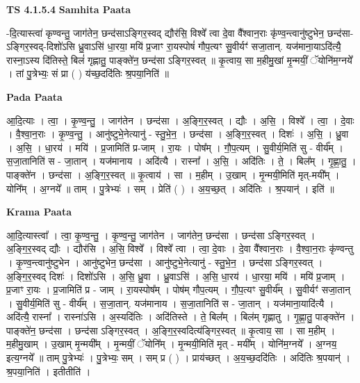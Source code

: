 \documentclass[17pt]{extarticle}
\begin{document}
\textbf{TS 4.1.5.4 } \newline
\textbf{Samhita Paata} \newline

-दि॒त्यास्त्वा॑ कृण्वन्तु॒ जाग॑तेन॒ छन्द॑साऽङ्गिर॒स्वद् द्यौर॑सि॒ विश्वे᳚ त्वा दे॒वा वै᳚श्वान॒राः कृ॑ण्व॒न्त्वानु॑ष्टुभेन॒ छन्द॑सा-ऽङ्गिर॒स्वद्-दिशो॑ऽसि ध्रु॒वाऽसि॑ धा॒रया॒ मयि॑ प्र॒जाꣳ रा॒यस्पोषं॑ गौप॒त्यꣳ सु॒वीर्यꣳ॑ सजा॒तान्. यज॑माना॒याऽदि॑त्यै॒ रास्ना॒ऽस्य दि॑तिस्ते॒ बिलं॑ गृह्णातु॒ पाङ्क्ते॑न॒ छन्द॑सा ऽङ्गिर॒स्वत् ॥ कृ॒त्वाय॒ सा म॒हीमु॒खां मृ॒न्मयीं॒ ॅयोनि॑म॒ग्नये᳚ । तां पु॒त्रेभ्यः॒ सं प्रा ( ) य॑च्छ॒ददि॑तिः श्र॒पया॒निति॑ ॥ \newline

\textbf{Pada Paata} \newline

आ॒दि॒त्याः । त्वा॒ । कृ॒ण्व॒न्तु॒ । जाग॑तेन । छन्द॑सा । अ॒ङ्गि॒र॒स्वत् । द्यौः । अ॒सि॒ । विश्वे᳚ । त्वा॒ । दे॒वाः । वै॒श्वा॒न॒राः । कृ॒ण्व॒न्तु॒ । आनु॑ष्टुभे॒नेत्यानु॑ - स्तु॒भे॒न॒ । छन्द॑सा । अ॒ङ्गि॒र॒स्वत् । दिशः॑ । अ॒सि॒ । ध्रु॒वा । अ॒सि॒ । धा॒रय॑ । मयि॑ । प्र॒जामिति॑ प्र-जाम् । रा॒यः । पोष᳚म् । गौ॒प॒त्यम् । सु॒वीर्य॒मिति॑ सु - वीर्य᳚म् । स॒जा॒तानिति॑ स - जा॒तान् । यज॑मानाय । अदि॑त्यै । रास्ना᳚ । अ॒सि॒ । अदि॑तिः । ते॒ । बिल᳚म् । गृ॒ह्णा॒तु॒ । पाङ्क्ते॑न । छन्द॑सा । अ॒ङ्गि॒र॒स्वत् ॥ कृ॒त्वाय॑ । सा । म॒हीम् । उ॒खाम् । मृ॒न्मयी॒मिति॑ मृत्-मयी᳚म् । योनि᳚म् । अ॒ग्नये᳚ ॥ ताम् । पु॒त्रेभ्यः॑ । सम् । प्रेति॑ ( ) । अ॒य॒च्छ॒त् । अदि॑तिः । श्र॒पयान्॑ । इति॑ ॥  \newline


\textbf{Krama Paata} \newline

आ॒दि॒त्यास्त्वा᳚ । त्वा॒ कृ॒ण्व॒न्तु॒ । कृ॒ण्व॒न्तु॒ जाग॑तेन । जाग॑तेन॒ छन्द॑सा । छन्द॑सा ऽङ्गिर॒स्वत् । अ॒ङ्गि॒र॒स्वद् द्यौः । द्यौर॑सि । अ॒सि॒ विश्वे᳚ । विश्वे᳚ त्वा । त्वा॒ दे॒वाः । दे॒वा वै᳚श्वान॒राः । वै॒श्वा॒न॒राः कृ॑ण्वन्तु । कृ॒ण्व॒न्त्वानु॑ष्टुभेन । आनु॑ष्टुभेन॒ छन्द॑सा । आनु॑ष्टुभे॒नेत्यानु॑ - स्तु॒भे॒न॒ । छन्द॑सा ऽङ्गिर॒स्वत् । अ॒ङ्गि॒र॒स्वद् दिशः॑ । दिशो॑ऽसि । अ॒सि॒ ध्रु॒वा । ध्रु॒वाऽसि॑ । अ॒सि॒ धा॒रय॑ । धा॒रया॒ मयि॑ । मयि॑ प्र॒जाम् । प्र॒जाꣳ रा॒यः । प्र॒जामिति॑ प्र - जाम् । रा॒यस्पोष᳚म् । पोष॑म् गौप॒त्यम् । गौ॒प॒त्यꣳ सु॒वीर्य᳚म् । सु॒वीर्यꣳ॑ सजा॒तान् । सु॒वीर्य॒मिति॑ सु - वीर्य᳚म् । स॒जा॒तान्. यज॑मानाय । स॒जा॒तानिति॑ स - जा॒तान् । यज॑माना॒यादि॑त्यै । अदि॑त्यै॒ रास्ना᳚ । रास्ना॑ऽसि । अ॒स्यदि॑तिः । अदि॑तिस्ते । ते॒ बिल᳚म् । बिल॑म् गृह्णातु । गृ॒ह्णा॒तु॒ पाङ्क्ते॑न । पाङ्क्ते॑न॒ छन्द॑सा । छन्द॑सा ऽङ्गिर॒स्वत् । अ॒ङ्गि॒र॒स्वदित्य॑ङ्गिर॒स्वत् ॥ कृ॒त्वाय॒ सा । सा म॒हीम् । म॒हीमु॒खाम् । उ॒खाम् मृ॒न्मयी᳚म् । मृ॒न्मयीं॒ ॅयोनि᳚म् । मृ॒न्मयी॒मिति॑ मृत् - मयी᳚म् । योनि॑म॒ग्नये᳚ । अ॒ग्नय॒ इत्य॒ग्नये᳚ ॥ ताम् पु॒त्रेभ्यः॑ । पु॒त्रेभ्यः॒ सम् । सम् प्र ( ) । प्राय॑च्छत् । अ॒य॒च्छ॒ददि॑तिः । अदि॑तिः श्र॒पयान्॑ । श्र॒पया॒निति॑ । इतीतीति॑ । \newline
\end{document}
